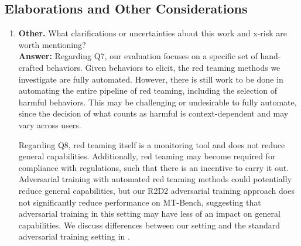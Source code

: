 \subsection{Elaborations and Other Considerations}
\begin{enumerate}[resume,leftmargin=*]
    \item \textbf{Other.} What clarifications or uncertainties about this work and x-risk are worth mentioning? \\
    \textbf{Answer:} 
    Regarding Q7, our evaluation focuses on a specific set of hand-crafted behaviors. Given behaviors to elicit, the red teaming methods we investigate are fully automated. However, there is still work to be done in automating the entire pipeline of red teaming, including the selection of harmful behaviors. This may be challenging or undesirable to fully automate, since the decision of what counts as harmful is context-dependent and may vary across users.

    Regarding Q8, red teaming itself is a monitoring tool and does not reduce general capabilities. Additionally, red teaming may become required for compliance with regulations, such that there is an incentive to carry it out. Adversarial training with automated red teaming methods could potentially reduce general capabilities, but our R2D2 adversarial training approach does not significantly reduce performance on MT-Bench, suggesting that adversarial training in this setting may have less of an impact on general capabilities. We discuss differences between our setting and the standard adversarial training setting in .
\end{enumerate}